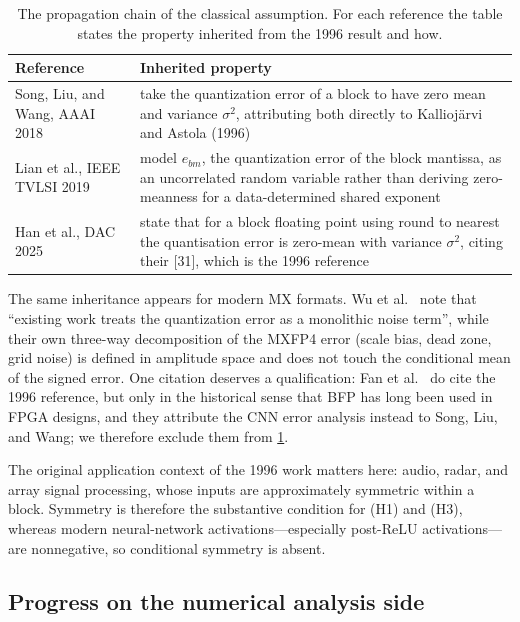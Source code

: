 \documentclass[twocolumn,review,hidelinks,oneeqnum,onetabnum,onefignum,onethmnum]{siamart251216}
\begin{document}
\begin{table}[!tb]
\centering
\caption{The propagation chain of the classical assumption. For each reference
the table states the property inherited from the 1996 result and how.}
\label{tab:chain}
\setlength{\tabcolsep}{5pt}
\small
\begin{tabular}{@{}p{}p{}@{}}
\toprule
Reference & Inherited property \\
\midrule
Song, Liu, and Wang, AAAI 2018 \cite{song2018} &
take the quantization error of a block to have zero mean and variance
$\sigma^2$, attributing both directly to Kallioj\"arvi and Astola (1996) \\
\addlinespace
Lian et al., IEEE TVLSI 2019 \cite{lian2019} &
model $e_{bm}$, the quantization error of the block mantissa, as an uncorrelated
random variable rather than deriving zero-meanness for a data-determined
shared exponent \\
\addlinespace
Han et al., DAC 2025 \cite{han2025} &
state that for a block floating point using round to nearest the quantisation
error is zero-mean with variance $\sigma^2$, citing their [31], which is the 1996
reference \\
\bottomrule
\end{tabular}
\end{table}

The same inheritance appears for modern MX formats. Wu et al.\
\cite{wu2026mxfp4} note that ``existing work treats the quantization error as a
monolithic noise term'', while their own three-way decomposition of the MXFP4
error (scale bias, dead zone, grid noise) is defined in amplitude space and does
not touch the conditional mean of the signed error. One citation deserves a
qualification: Fan et al.\ \cite{fan2018} do cite the 1996 reference, but only in
the historical sense that BFP has long been used in FPGA designs, and they
attribute the CNN error analysis instead to Song, Liu, and Wang; we therefore
exclude them from \cref{tab:chain}.

The original application context of the 1996 work matters here: audio, radar, and
array signal processing, whose inputs are approximately symmetric within a block.
Symmetry is therefore the substantive condition for (H1) and (H3), whereas modern
neural-network activations---especially post-ReLU activations---are nonnegative,
so conditional symmetry is absent.

\subsection{Progress on the numerical analysis side}
\end{document}
